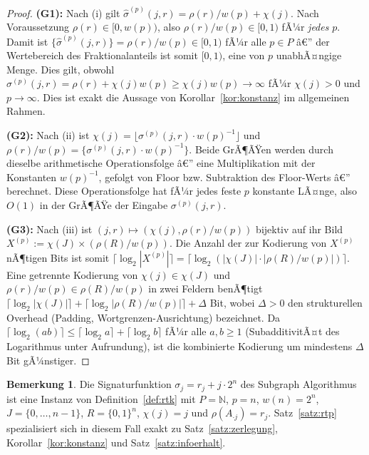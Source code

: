 ﻿\documentclass[a4paper,12pt]{article}
\theoremstyle{definition}
\newtheorem{bemerkung}{Bemerkung}
\begin{document}
\begin{proof}
	\textbf{(G1):} Nach (i) gilt $\hat\sigma^{(p)}(j,r) = \rho(r)/w(p) + \chi(j)$.
	Nach Voraussetzung $\rho(r)\in[0,w(p))$, also $\rho(r)/w(p)\in[0,1)$ fÃ¼r
	\emph{jedes} $p$. Damit ist $\{\hat\sigma^{(p)}(j,r)\} = \rho(r)/w(p)\in[0,1)$
	fÃ¼r alle $p\in P$ â€” der Wertebereich des Fraktionalanteils ist somit
	$[0,1)$, eine von $p$ unabhÃ¤ngige Menge. Dies gilt, obwohl
	$\sigma^{(p)}(j,r) = \rho(r)+\chi(j)w(p) \geq \chi(j)w(p) \to \infty$ fÃ¼r
	$\chi(j)>0$ und $p\to\infty$. Dies ist exakt die Aussage von
	Korollar~\ref{kor:konstanz} im allgemeinen Rahmen.

	\textbf{(G2):} Nach (ii) ist
	$\chi(j) = \lfloor \sigma^{(p)}(j,r)\cdot w(p)^{-1}\rfloor$ und
	$\rho(r)/w(p) = \{\sigma^{(p)}(j,r)\cdot w(p)^{-1}\}$. Beide GrÃ¶ÃŸen
	werden durch dieselbe arithmetische Operationsfolge â€” eine
	Multiplikation mit der Konstanten $w(p)^{-1}$, gefolgt von Floor bzw.
	Subtraktion des Floor-Werts â€” berechnet. Diese Operationsfolge hat fÃ¼r
	jedes feste $p$ konstante LÃ¤nge, also $O(1)$ in der GrÃ¶ÃŸe der Eingabe
	$\sigma^{(p)}(j,r)$.

	\textbf{(G3):} Nach (iii) ist $(j,r)\mapsto(\chi(j),\rho(r)/w(p))$
	bijektiv auf ihr Bild $X^{(p)} := \chi(J)\times(\rho(R)/w(p))$. Die
	Anzahl der zur Kodierung von $X^{(p)}$ nÃ¶tigen Bits ist somit
	$\lceil\log_2|X^{(p)}|\rceil = \lceil\log_2(|\chi(J)|\cdot|\rho(R)/w(p)|)\rceil$.
	Eine getrennte Kodierung von $\chi(j)\in\chi(J)$ und
	$\rho(r)/w(p)\in\rho(R)/w(p)$ in zwei Feldern benÃ¶tigt
	$\lceil\log_2|\chi(J)|\rceil + \lceil\log_2|\rho(R)/w(p)|\rceil + \Delta$
	Bit, wobei $\Delta>0$ den strukturellen Overhead (Padding,
	Wortgrenzen-Ausrichtung) bezeichnet. Da
	$\lceil\log_2(ab)\rceil \leq \lceil\log_2 a\rceil + \lceil\log_2 b\rceil$
	fÃ¼r alle $a,b\geq1$ (SubadditivitÃ¤t des Logarithmus unter Aufrundung),
	ist die kombinierte Kodierung um mindestens $\Delta$ Bit gÃ¼nstiger.
	\qedhere
\end{proof}

\begin{bemerkung}
\label{bem:instanz}
	Die Signaturfunktion $\sigma_j = r_j + j\cdot 2^n$ des Subgraph
	Algorithmus ist eine Instanz von Definition~\ref{def:rtk} mit
	$P=\mathbb{N}$, $p=n$, $w(n)=2^n$, $J=\{0,\ldots,n-1\}$,
	$R=\{0,1\}^n$, $\chi(j)=j$ und $\rho(A_{\cdot j}) = r_j$. Satz~\ref{satz:rtp}
	spezialisiert sich in diesem Fall exakt zu
	Satz~\ref{satz:zerlegung}, Korollar~\ref{kor:konstanz} und
	Satz~\ref{satz:infoerhalt}.
\end{bemerkung}
\end{document}
